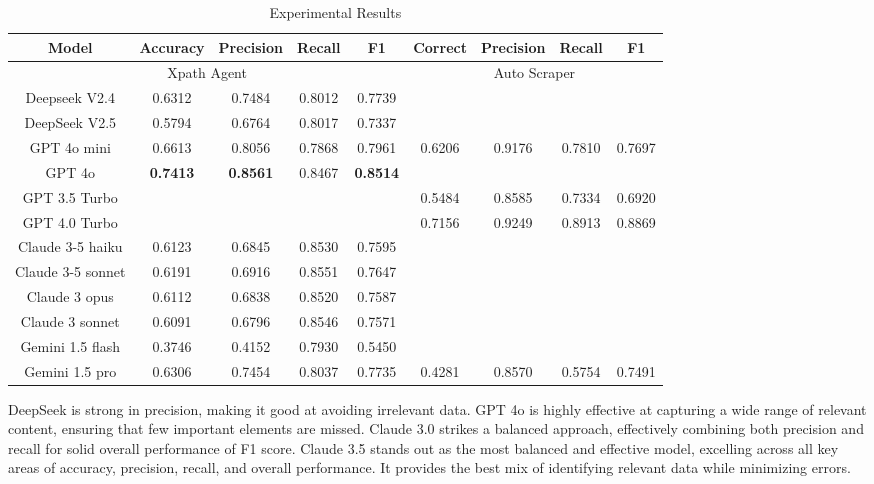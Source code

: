 \documentclass[a4paper]{article}
\begin{document}
\begin{table}[h]
  \centering
    \begin{tabular}{|c|c|c|c|c|c|c|c|c|}
    \hline
    \textbf{Model} & \textbf{Accuracy} & \textbf{Precision} & \textbf{Recall} & \textbf{F1} & \textbf{Correct} & \textbf{Precision} & \textbf{Recall} & \textbf{F1}\\ \hline
    \multicolumn{5}{|c|}{\cellcolor{yellow!30}Xpath Agent} & \multicolumn{4}{|c|}{\cellcolor{cyan!20} Auto Scraper}\\ \hline
    Deepseek V2.4       & 0.6312 & 0.7484 & 0.8012 & 0.7739       & & & &  \\
    DeepSeek V2.5       & 0.5794 & 0.6764 & 0.8017 & 0.7337       & & & & \\ 
    GPT 4o mini         & 0.6613 & 0.8056 & 0.7868 & 0.7961       & 0.6206 & 0.9176 & 0.7810 & 0.7697 \\
    GPT 4o              &\textbf{0.7413} &\textbf{0.8561} &0.8467 &\textbf{0.8514}            & & & & \\
    GPT 3.5 Turbo       & & & &                                   & 0.5484 & 0.8585 & 0.7334 & 0.6920 \\
    GPT 4.0 Turbo       & & & &                                   & 0.7156 & 0.9249 & 0.8913 & 0.8869 \\
    Claude 3-5 haiku    & 0.6123 & 0.6845 & 0.8530 & 0.7595       & & & & \\
    Claude 3-5 sonnet   & 0.6191 & 0.6916 & 0.8551 & 0.7647       & & & & \\
    Claude 3 opus       & 0.6112 & 0.6838 & 0.8520 & 0.7587       & & & & \\
    Claude 3 sonnet     & 0.6091 & 0.6796 & 0.8546 & 0.7571       & & & & \\
    Gemini 1.5 flash    & 0.3746 & 0.4152 & 0.7930 & 0.5450       & & & & \\
    Gemini 1.5 pro      & 0.6306 & 0.7454 & 0.8037 & 0.7735       & 0.4281 & 0.8570 & 0.5754 & 0.7491 \\

    \hline
    \end{tabular}

  \caption{Experimental Results}
\end{table}
    
DeepSeek is strong in precision, making it good at avoiding irrelevant data. GPT 4o is highly effective at capturing a wide range of relevant content, ensuring that few important elements are missed. Claude 3.0 strikes a balanced approach, effectively combining both precision and recall for solid overall performance of F1 score. Claude 3.5 stands out as the most balanced and effective model, excelling across all key areas of accuracy, precision, recall, and overall performance. It provides the best mix of identifying relevant data while minimizing errors.
    
\end{document}

